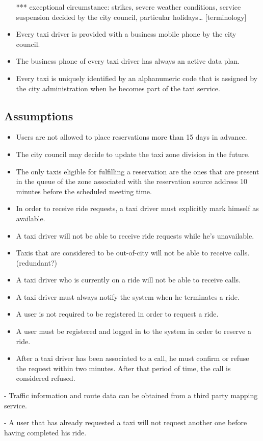 \begin{itemize}
*** exceptional circumstance: strikes, severe weather conditions, service suspension decided by the city council, particular holidays… [terminology]
\item Every taxi driver is provided with a business mobile phone by the city council.
\item The business phone of every taxi driver has always an active data plan.
\item Every taxi is uniquely identified by an alphanumeric code that is assigned by the city administration when he becomes part of the taxi service.
\end{itemize}

\subsection{Assumptions}
\begin{itemize}
\item Users are not allowed to place reservations more than 15 days in advance. 
\item The city council may decide to update the taxi zone division in the future. 
\item The only taxis eligible for fulfilling a reservation are the ones that are present in the queue of the zone associated with the reservation source address 10 minutes before the scheduled meeting time.
\item In order to receive ride requests, a taxi driver must explicitly mark himself as available.
\item A taxi driver will not be able to receive ride requests while he’s unavailable.
\item Taxis that are considered to be out-of-city will not be able to receive calls. (redundant?)
\item A taxi driver who is currently on a ride will not be able to receive calls.
\item A taxi driver must always notify the system when he terminates a ride. 
\item A user is not required to be registered in order to request a ride.
\item A user must be registered and logged in to the system in order to reserve a ride.
\item After a taxi driver has been associated to a call, he must confirm or refuse the request within two minutes. After that period of time, the call is considered refused. 
\end{itemize}

- Traffic information and route data can be obtained from a third party mapping service.

- A user that has already requested a taxi will not request another one before having completed his ride.